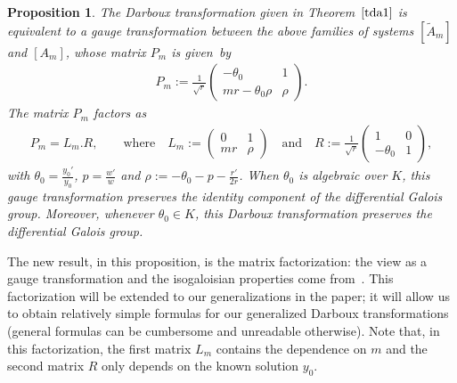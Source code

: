 \documentclass[pdftex]{sigma}%
\numberwithin{equation}{section}
\newtheorem{Proposition}[Theorem]{Proposition}
 { \theoremstyle{definition}
\newtheorem{Definition}[Theorem]{Definition}
\newtheorem{Note}[Theorem]{Note}
\newtheorem{Example}[Theorem]{Example}
\newtheorem{Remark}[Theorem]{Remark} }
\begin{document}
\begin{Proposition} \label{prop1}
The Darboux transformation given in Theorem~$\ref{tda1}$ is
equivalent to a
gauge transformation between the above families of systems $[\tilde{A}_m]$ and $[A_m]$,
whose matrix $P_m$ is given~by
\begin{gather}\label{gauge}
P_m:=\frac{1}{\sqrt{r}} \begin{pmatrix}
- \theta_0&1 \\ mr - \theta_0 \rho &\rho
\end{pmatrix}\!.
\end{gather}
The matrix $P_m$ factors as
\begin{gather*}
P_m= L_m . R, \qquad\textrm{where} \quad
L_m:= \begin{pmatrix}
0 & 1 \\ m r & \rho
\end{pmatrix}
\quad\textrm{and}\quad
R:=\frac{1}{\sqrt{r}}\begin{pmatrix}
1 & 0 \\ -\theta_0 & 1
\end{pmatrix}\!,
\end{gather*}
with $\theta_0=\frac{y_0'}{y_0}$, $p=\frac{w'}{w}$ and $\rho:=-\theta_0-p-\frac{r'}{2r}$.
When $\theta_0$ is algebraic over $K$, this gauge transformation preserves the identity component of the differential Galois group. 	
Moreover, whenever
$\theta_0 \in K$, this Darboux transformation
preserves the differential Galois group. 	
\end{Proposition}

\begin{Remark}
The new result, in this proposition, is the matrix factorization: the view as a gauge transformation and the isogaloisian properties come from~\cite{AP1}.
This factorization will be extended to our generalizations in the paper; it will allow us to obtain relatively simple formulas for our generalized Darboux transformations (general formulas can be cumbersome and unreadable otherwise).
Note that, in this factorization, the first matrix $L_m$ contains the dependence on $m$ and the second matrix $R$ only depends on the known solution $y_0$.
\end{Remark}
\end{document}

